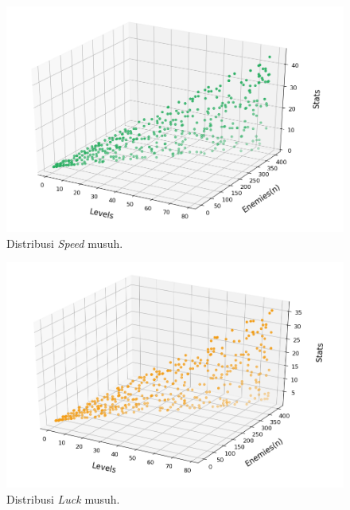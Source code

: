 \begin{figure} [!h] \centering
	\includegraphics[scale=0.58]{img/EnemySpeedDistrib.png}
	\caption{Distribusi \textit{Speed} musuh.}
	\label{fig:enemy_spd_distrib}
	\vspace{2ex}
\end{figure}

\begin{figure} [!h] \centering
	\includegraphics[scale=0.58]{img/EnemyLuckDistrib.png}
	\caption{Distribusi \textit{Luck} musuh.}
	\label{fig:enemy_luck_distrib}
\end{figure}
\vspace{1ex}